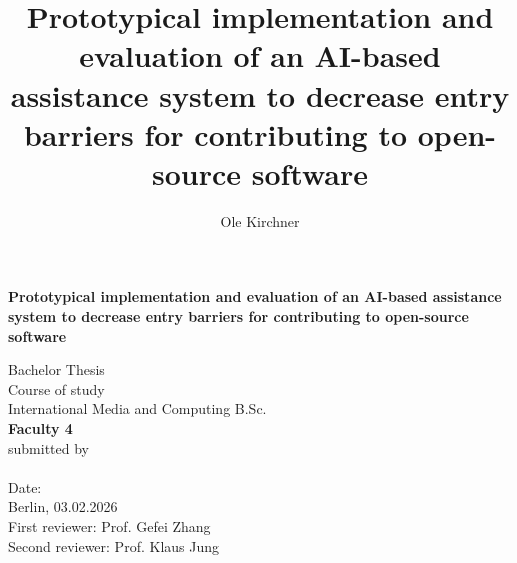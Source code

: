 \documentclass[12pt]{report}
\title{Prototypical implementation and evaluation of an AI-based  assistance system to decrease entry barriers for contributing to open-source software}
\author{Ole Kirchner}
\begin{document}
    \begin{titlepage}
        \centering
        {
            {\Huge \textbf{\textcolor{htwgreen}{Prototypical implementation and evaluation of an AI-based assistance
            system to decrease entry barriers for contributing to open-source
            software}}}\\[1cm]
        }

        {\Large Bachelor Thesis}\\[1.8cm]

        Course of study\\[0.5cm]

        {\LARGE International Media and Computing B.Sc.}\\[0.5cm]

        {\LARGE \textbf{\textcolor{htwgreen}{Faculty 4}}}\\[0.5cm]

        submitted by\\[0.5cm]

        {\LARGE \@author}\\[1.8cm]

        Date:\\[0.2cm]
        Berlin, 03.02.2026\\[1cm]

        {\LARGE First reviewer: Prof. Gefei Zhang\\[0.4cm]
        Second reviewer: Prof. Klaus Jung}
    \end{titlepage}

    
\end{document}
